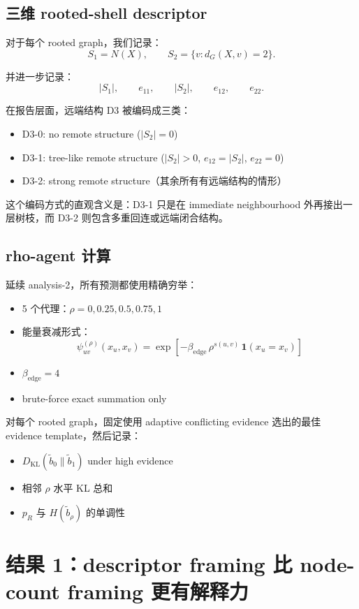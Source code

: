 \documentclass[11pt,a4paper]{ctexart}
\begin{document}
\subsection{三维 rooted-shell descriptor}

对于每个 rooted graph，我们记录：
\[
S_1 = N(X),
\qquad
S_2 = \{v : d_G(X,v)=2\}.
\]

并进一步记录：
\[
|S_1|,
\qquad
 e_{11},
\qquad
 |S_2|,
\qquad
 e_{12},
\qquad
 e_{22}.
\]

在报告层面，远端结构 D3 被编码成三类：
\begin{itemize}
    \item D3-0: no remote structure ($|S_2|=0$)
    \item D3-1: tree-like remote structure ($|S_2|>0$, $e_{12}=|S_2|$, $e_{22}=0$)
    \item D3-2: strong remote structure（其余所有有远端结构的情形）
\end{itemize}

这个编码方式的直观含义是：D3-1 只是在 immediate neighbourhood 外再接出一层树枝，而 D3-2 则包含多重回连或远端闭合结构。

\subsection{rho-agent 计算}

延续 analysis-2，所有预测都使用精确穷举：
\begin{itemize}
    \item 5 个代理：$\rho = 0, 0.25, 0.5, 0.75, 1$
    \item 能量衰减形式：
    \[
    \psi^{(\rho)}_{uv}(x_u,x_v)
    =
    \exp\!\left[-\beta_{\mathrm{edge}}\,\rho^{s(u,v)}\,\mathbf{1}(x_u=x_v)\right]
    \]
    \item $\beta_{\mathrm{edge}} = 4$
    \item brute-force exact summation only
\end{itemize}

对每个 rooted graph，固定使用 adaptive conflicting evidence 选出的最佳 evidence template，然后记录：
\begin{itemize}
    \item $D_{\mathrm{KL}}(\tilde b_0 \| \tilde b_1)$ under high evidence
    \item 相邻 $\rho$ 水平 KL 总和
    \item $p_R$ 与 $H(\tilde b_\rho)$ 的单调性
\end{itemize}

\section{结果 1：descriptor framing 比 node-count framing 更有解释力}
\end{document}
